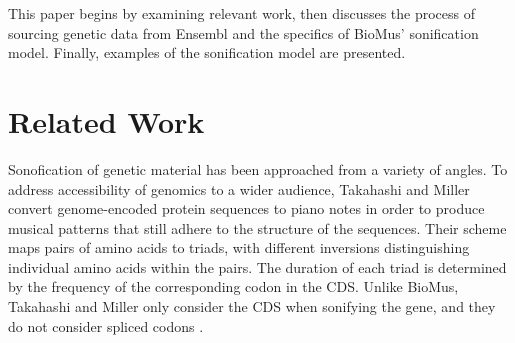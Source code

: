 \documentclass[letterpaper]{article}
\begin{document}





This paper begins by examining relevant work, then discusses the process of sourcing genetic data from Ensembl and the specifics of BioMus’ sonification model. Finally, examples of the sonification model are presented.

\section{Related Work}

Sonofication of genetic material has been approached from a variety of angles. To address accessibility of genomics to a wider audience, Takahashi and Miller convert genome-encoded protein sequences to piano notes in order to produce musical patterns that still adhere to the structure of the sequences. Their scheme maps pairs of amino acids to triads, with different inversions distinguishing individual amino acids within the pairs. The duration of each triad is determined by the frequency of the corresponding codon in the CDS. Unlike BioMus, Takahashi and Miller only consider the CDS when sonifying the gene, and they do not consider spliced codons \cite{takahashi_miller_2007}. 
\end{document}
